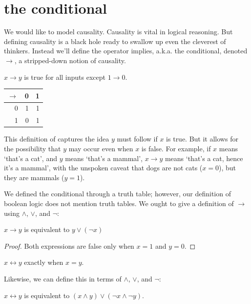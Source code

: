 \message{ !name(truth.tex)}\documentclass{scrbook}
\renewcommand{\implies}{\to}
\renewcommand{\iff}{\leftrightarrow}
\begin{document}
\section[The Conditional]{the conditional}
We would like to model causality. Causality is vital in logical reasoning. But defining causality is a black hole ready to swallow up even the cleverest of thinkers.  Instead we'll define the operator implies, a.k.a. the conditional, denoted $\implies$, a stripped-down notion of causality. 
\begin{defn}[implies $\implies$]
  $x\implies y$ is true for all inputs except $1\implies 0$. 
\begin{center}  
\begin{tabular}{r|rr}
$\implies$ & 0 & 1 \\
\hline
0 & 1 & 1 \\
1 & 0 & 1 \\
\end{tabular}
\end{center}
\end{defn}
This definition of captures the idea $y$ must follow if $x$ is true. But it allows for the possibility that $y$ may occur even when $x$ is false. For example, if $x$ means `that's a cat', and $y$ means `that's a mammal', $x\implies y$ means `that's a cat, hence it's a mammal', with the unspoken caveat that dogs are not cats ($x=0$), but they are mammals ($y=1$). 

We defined the conditional through a truth table; however, our definition of boolean logic does not mention truth tables. We ought to give a definition of $\implies$ using $\wedge$, $\vee$, and $\neg$:
\begin{theorem}
  $x\implies y$ is equivalent to $y \vee (\neg x)$
\end{theorem}
\begin{proof}
  Both expressions are false only when $x=1$ and $y=0$. 
\end{proof}

\begin{defn}[logical equivalence $\iff$]
  $x\iff y$ exactly when $x = y$. 
\end{defn}
Likewise, we can define this in terms of $\wedge$, $\vee$, and $\neg$:
\begin{theorem}
  $x\iff y$ is equivalent to $(x \wedge y) \vee (\neg x \wedge \neg y)$. 
\end{theorem}
\end{document}
